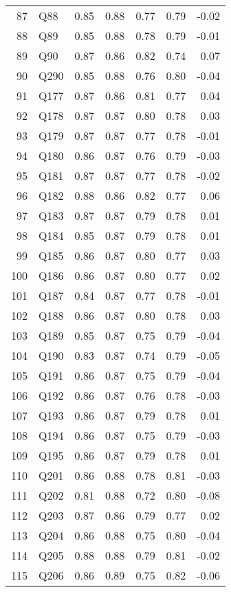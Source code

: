 \documentclass{amsart}
\begin{document}
\begin{longtable}{rlrrrrr}
  87 & Q88 & 0.85 & 0.88 & 0.77 & 0.79 & -0.02 \\ 
  88 & Q89 & 0.85 & 0.88 & 0.78 & 0.79 & -0.01 \\ 
  89 & Q90 & 0.87 & 0.86 & 0.82 & 0.74 & 0.07 \\ 
  90 & Q290 & 0.85 & 0.88 & 0.76 & 0.80 & -0.04 \\ 
  91 & Q177 & 0.87 & 0.86 & 0.81 & 0.77 & 0.04 \\ 
  92 & Q178 & 0.87 & 0.87 & 0.80 & 0.78 & 0.03 \\ 
  93 & Q179 & 0.87 & 0.87 & 0.77 & 0.78 & -0.01 \\ 
  94 & Q180 & 0.86 & 0.87 & 0.76 & 0.79 & -0.03 \\ 
  95 & Q181 & 0.87 & 0.87 & 0.77 & 0.78 & -0.02 \\ 
  96 & Q182 & 0.88 & 0.86 & 0.82 & 0.77 & 0.06 \\ 
  97 & Q183 & 0.87 & 0.87 & 0.79 & 0.78 & 0.01 \\ 
  98 & Q184 & 0.85 & 0.87 & 0.79 & 0.78 & 0.01 \\ 
  99 & Q185 & 0.86 & 0.87 & 0.80 & 0.77 & 0.03 \\ 
  100 & Q186 & 0.86 & 0.87 & 0.80 & 0.77 & 0.02 \\ 
  101 & Q187 & 0.84 & 0.87 & 0.77 & 0.78 & -0.01 \\ 
  102 & Q188 & 0.86 & 0.87 & 0.80 & 0.78 & 0.03 \\ 
  103 & Q189 & 0.85 & 0.87 & 0.75 & 0.79 & -0.04 \\ 
  104 & Q190 & 0.83 & 0.87 & 0.74 & 0.79 & -0.05 \\ 
  105 & Q191 & 0.86 & 0.87 & 0.75 & 0.79 & -0.04 \\ 
  106 & Q192 & 0.86 & 0.87 & 0.76 & 0.78 & -0.03 \\ 
  107 & Q193 & 0.86 & 0.87 & 0.79 & 0.78 & 0.01 \\ 
  108 & Q194 & 0.86 & 0.87 & 0.75 & 0.79 & -0.03 \\ 
  109 & Q195 & 0.86 & 0.87 & 0.79 & 0.78 & 0.01 \\ 
  110 & Q201 & 0.86 & 0.88 & 0.78 & 0.81 & -0.03 \\ 
  111 & Q202 & 0.81 & 0.88 & 0.72 & 0.80 & -0.08 \\ 
  112 & Q203 & 0.87 & 0.86 & 0.79 & 0.77 & 0.02 \\ 
  113 & Q204 & 0.86 & 0.88 & 0.75 & 0.80 & -0.04 \\ 
  114 & Q205 & 0.88 & 0.88 & 0.79 & 0.81 & -0.02 \\ 
  115 & Q206 & 0.86 & 0.89 & 0.75 & 0.82 & -0.06 \\ 

\end{longtable}
\end{document}
